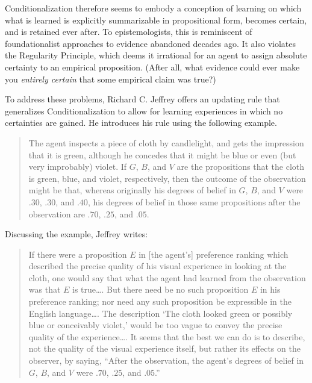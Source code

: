 Conditionalization therefore seems to embody a conception of learning on which what is learned is explicitly summarizable in propositional form, becomes certain, and is retained ever after. To epistemologists, this is reminiscent of foundationalist approaches to evidence abandoned decades ago. It also violates the Regularity Principle, which deems it irrational for an agent to assign absolute certainty to an empirical proposition. (After all, what evidence could ever make you \emph{entirely certain} that some empirical claim was true?) 

To address these problems, Richard C. Jeffrey offers an updating rule that generalizes Conditionalization to allow for learning experiences in which no certainties are gained. He introduces his rule using the following example.
\begin{quote}
The agent inspects a piece of cloth by candlelight, and gets the impression that it is green, although he concedes that it might be blue or even (but very improbably) violet. If $G$, $B$, and $V$ are the propositions that the cloth is green, blue, and violet, respectively, then the outcome of the observation might be that, whereas originally his degrees of belief in $G$, $B$, and $V$ were $.30$, $.30$, and $.40$, his degrees of belief in those same propositions after the observation are $.70$, $.25$, and $.05$. \citep[p.\ 154]{JeffreyLogic}
\end{quote}
Discussing the example, Jeffrey writes:
\begin{quote}
If there were a proposition $E$ in [the agent's] preference ranking which described the precise quality of his visual experience in looking at the cloth, one would say that what the agent had learned from the observation was that $E$ is true\ldots. But there need be no such proposition $E$ in his preference ranking; nor need any such proposition be expressible in the English language\ldots. The description `The cloth looked green or possibly blue or conceivably violet,' would be too vague to convey the precise quality of the experience\ldots. It seems that the best we can do is to describe, not the quality of the visual experience itself, but rather its effects on the observer, by saying, ``After the observation, the agent's degrees of belief in $G$, $B$, and $V$ were $.70$, $.25$, and $.05$.'' \citep[pp.~154--5]{JeffreyLogic}
\end{quote}

